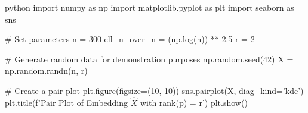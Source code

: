 python
import numpy as np
import matplotlib.pyplot as plt
import seaborn as sns

# Set parameters
n = 300
ell_n_over_n = (np.log(n)) ** 2.5
r = 2

# Generate random data for demonstration purposes
np.random.seed(42)
X = np.random.randn(n, r)

# Create a pair plot
plt.figure(figsize=(10, 10))
sns.pairplot(X, diag_kind='kde')
plt.title(f'Pair Plot of Embedding \(\hat{X}\) with rank(p) = {r}')
plt.show()